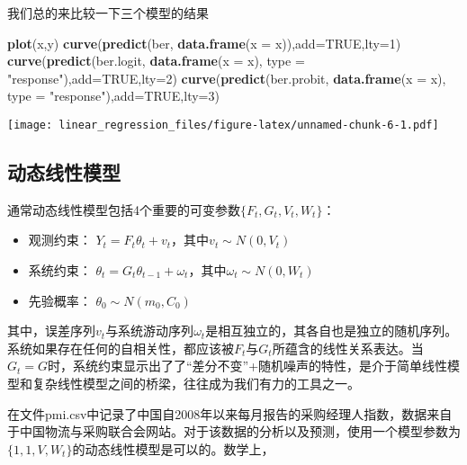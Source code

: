 \documentclass[]{ctexart}
\newenvironment{Shaded}{\begin{snugshade}}{\end{snugshade}}
\newcommand{\KeywordTok}[1]{\textcolor[rgb]{0.13,0.29,0.53}{\textbf{{#1}}}}
\newcommand{\DataTypeTok}[1]{\textcolor[rgb]{0.13,0.29,0.53}{{#1}}}
\newcommand{\DecValTok}[1]{\textcolor[rgb]{0.00,0.00,0.81}{{#1}}}
\newcommand{\StringTok}[1]{\textcolor[rgb]{0.31,0.60,0.02}{{#1}}}
\newcommand{\OtherTok}[1]{\textcolor[rgb]{0.56,0.35,0.01}{{#1}}}
\newcommand{\NormalTok}[1]{{#1}}
\providecommand{\tightlist}{%
  \setlength{\itemsep}{0pt}\setlength{\parskip}{0pt}}
\begin{document}
我们总的来比较一下三个模型的结果

\begin{Shaded}
\begin{Highlighting}[]
\KeywordTok{plot}\NormalTok{(x,y)}
\KeywordTok{curve}\NormalTok{(}\KeywordTok{predict}\NormalTok{(ber, }\KeywordTok{data.frame}\NormalTok{(}\DataTypeTok{x =} \NormalTok{x)),}\DataTypeTok{add=}\OtherTok{TRUE}\NormalTok{,}\DataTypeTok{lty=}\DecValTok{1}\NormalTok{)}
\KeywordTok{curve}\NormalTok{(}\KeywordTok{predict}\NormalTok{(ber.logit, }\KeywordTok{data.frame}\NormalTok{(}\DataTypeTok{x =} \NormalTok{x), }\DataTypeTok{type =} \StringTok{"response"}\NormalTok{),}\DataTypeTok{add=}\OtherTok{TRUE}\NormalTok{,}\DataTypeTok{lty=}\DecValTok{2}\NormalTok{)}
\KeywordTok{curve}\NormalTok{(}\KeywordTok{predict}\NormalTok{(ber.probit, }\KeywordTok{data.frame}\NormalTok{(}\DataTypeTok{x =} \NormalTok{x), }\DataTypeTok{type =} \StringTok{"response"}\NormalTok{),}\DataTypeTok{add=}\OtherTok{TRUE}\NormalTok{,}\DataTypeTok{lty=}\DecValTok{3}\NormalTok{)}
\end{Highlighting}
\end{Shaded}

\texttt{[image: linear\_regression\_files/figure-latex/unnamed-chunk-6-1.pdf]}

\subsection{动态线性模型}

通常动态线性模型包括4个重要的可变参数\(\{F_t,G_t,V_t,W_t\}\)：

\begin{itemize}
\tightlist
\item
  观测约束： \(Y_t = F_t \theta_t + v_t\)，其中\(v_t \sim N(0,V_t)\)
\item
  系统约束：
  \(\theta_t = G_t \theta_{t-1} + \omega_t\)，其中\(\omega_t\sim N(0,W_t)\)
\item
  先验概率： \(\theta_0\sim N(m_0,C_0)\)
\end{itemize}

其中，误差序列\(v_t\)与系统游动序列\(\omega_t\)是相互独立的，其各自也是独立的随机序列。系统如果存在任何的自相关性，都应该被\(F_t\)与\(G_t\)所蕴含的线性关系表达。当\(G_t=G\)时，系统约束显示出了了``差分不变''+随机噪声的特性，是介于简单线性模型和复杂线性模型之间的桥梁，往往成为我们有力的工具之一。

在文件pmi.csv中记录了中国自2008年以来每月报告的采购经理人指数，数据来自于中国物流与采购联合会网站。对于该数据的分析以及预测，使用一个模型参数为\(\{1,1,V,W_t \}\)的动态线性模型是可以的。数学上，
\end{document}
